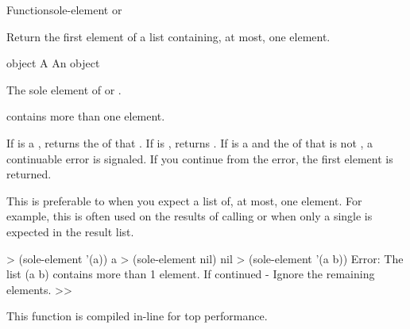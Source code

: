 \documentclass[10pt,twoside,english,pdftex]{article}
\newcommand{\inline}{This function is compiled in-line for top performance.}
\begin{document}
\begin{functiondoc}{Function}{sole-element}{
    \returns{}  or \nil} 
%
%
  
\fnsyntax

\fnpurpose Return the first element of a list containing, at most, one element.

\fnpackage {}

\fnmodule {}

\fnargs
\begin{args}{object}
\arg[list] A 
\arg[element] An object
\end{args}

\fnreturns The sole element of  or \nil.

\fnerrors
{} contains more than one element.

\fndescription If  is a , 
returns the  of that . If  is \nil,
 returns \nil.  If  is a 
and the  of that  is not \nil, a continuable error is
signaled.  If you continue from the error, the first element is returned.

%
%
This  is preferable to  when you
expect a list of, at most, one element.  For example, this  is
often used on the results of calling
 or
 when only a single
 is expected in the result list.

\fnexamples
%
\W\supp
\begin{example}
  > (sole-element '(a))
  a
  > (sole-element nil)
  nil\goodpagebreak
  > (sole-element '(a b))
  Error: The list (a b) contains more than 1 element.
         If continued - Ignore the remaining elements.
  >>
\end{example}

\fnnote \inline

\end{functiondoc}

\end{document}

